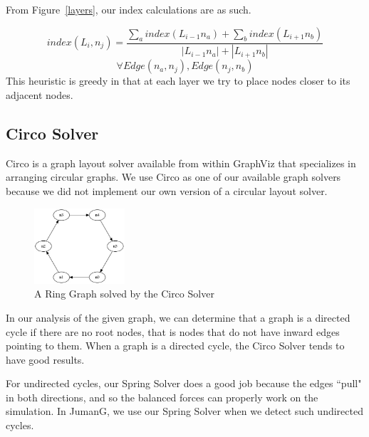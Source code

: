 \documentclass{article}
\begin{document}
From Figure~\ref{layers}, our index calculations are as such.

$$ index(L_i , n_j) = \frac{\sum\limits_a index(L_{i-1}n_a) + \sum\limits_b index(L_{i+1}n_b)}{|L_{i-1}n_a| + |L_{i+1}n_b|}$$
$$\forall Edge(n_a , n_j), Edge(n_j , n_b)$$
This heuristic is greedy in that at each layer we try to place nodes closer to its adjacent nodes.




\subsection{Circo Solver}
Circo is a graph layout solver available from within GraphViz that specializes in arranging circular graphs. 
We use Circo as one of our available graph solvers because we did not implement our own version of a circular layout solver.

\begin{figure}[h!]
\caption{A Ring Graph solved by the Circo Solver}
\centering
\includegraphics[width=0.3\textwidth]{circo.jpg}
\end{figure}

In our analysis of the given graph, we can determine that a graph is a directed cycle if there are no root nodes, that is nodes that do not have inward edges pointing to them. When a graph is a directed cycle, the Circo Solver tends to have good results. 

For undirected cycles, our Spring Solver does a good job because the edges ``pull" in both directions, and so the balanced forces can properly work on the simulation. In JumanG, we use our Spring Solver when we detect such undirected cycles. 

\end{document}
